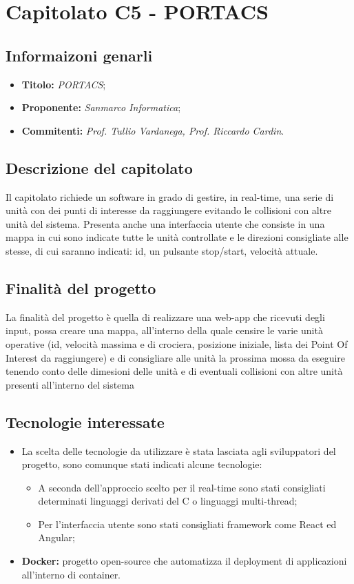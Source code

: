 \section{Capitolato C5 - PORTACS}
\subsection{Informaizoni genarli}
\begin{itemize}
    \item \textbf{Titolo:} \textit{PORTACS};
    \item \textbf{Proponente:} \textit{Sanmarco Informatica};
    \item \textbf{Commitenti:} \textit{Prof. Tullio Vardanega, Prof. Riccardo Cardin}.
\end{itemize}
\subsection{Descrizione del capitolato}
Il capitolato richiede un software in grado di gestire, in real-time, una serie di unità con dei punti di interesse da raggiungere evitando le collisioni con altre unità del sistema. 
Presenta anche una interfaccia utente che consiste in una mappa in cui sono indicate tutte le unità controllate e le direzioni consigliate alle stesse, 
di cui saranno indicati: id, un pulsante stop/start, velocità attuale.
\subsection{Finalità del progetto}
La finalità del progetto è quella di realizzare una web-app che ricevuti degli input, possa creare una mappa, all'interno della quale censire le varie unità operative 
(id, velocità massima e di crociera, posizione iniziale, lista dei Point Of Interest da raggiungere) e di consigliare 
alle unità la prossima mossa da eseguire tenendo conto delle dimesioni delle unità e di eventuali collisioni con altre unità presenti all'interno del sistema 
\subsection{Tecnologie interessate}
\begin{itemize}
    \item La scelta delle tecnologie da utilizzare è stata lasciata agli sviluppatori del progetto, sono comunque stati indicati alcune tecnologie:
    \begin{itemize}
        \item A seconda dell'approccio scelto per il real-time sono stati consigliati determinati linguaggi derivati del C o linguaggi multi-thread;
        \item Per l'interfaccia utente sono stati consigliati framework come React ed Angular;
    \end{itemize}
    \item \textbf{Docker:} progetto open-source che automatizza il deployment di applicazioni all’interno di container.
\end{itemize}

